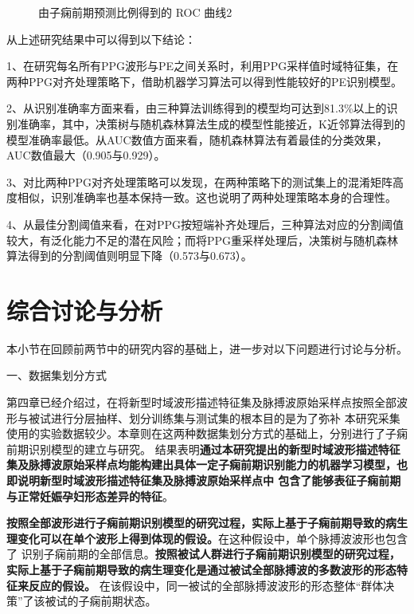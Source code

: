 \begin{figure}[htbp]
      \centering
      \quad
      \caption{\label{fig:model_roc2}由子痫前期预测比例得到的 ROC 曲线2}
\end{figure}

从上述研究结果中可以得到以下结论：

1、在研究每名所有PPG波形与PE之间关系时，利用PPG采样值时域特征集，在两种PPG对齐处理策略下，借助机器学习算法可以得到性能较好的PE识别模型。

2、从识别准确率方面来看，由三种算法训练得到的模型均可达到81.3\%以上的识别准确率，其中，决策树与随机森林算法生成的模型性能接近，K近邻算法得到的模型准确率最低。从AUC数值方面来看，随机森林算法有着最佳的分类效果，AUC数值最大（0.905与0.929）。

3、对比两种PPG对齐处理策略可以发现，在两种策略下的测试集上的混淆矩阵高度相似，识别准确率也基本保持一致。这也说明了两种处理策略本身的合理性。

4、从最佳分割阈值来看，在对PPG按短端补齐处理后，三种算法对应的分割阈值较大，有泛化能力不足的潜在风险；而将PPG重采样处理后，决策树与随机森林算法得到的分割阈值则明显下降（0.573与0.673）。

\section{综合讨论与分析}
本小节在回顾前两节中的研究内容的基础上，进一步对以下问题进行讨论与分析。

一、数据集划分方式

第四章已经介绍过，在将新型时域波形描述特征集及脉搏波原始采样点按照全部波形与被试进行分层抽样、划分训练集与测试集的根本目的是为了弥补
本研究采集使用的实验数据较少。本章则在这两种数据集划分方式的基础上，分别进行了子痫前期识别模型的建立与研究。
结果表明\textbf{通过本研究提出的新型时域波形描述特征集及脉搏波原始采样点均能构建出具体一定子痫前期识别能力的机器学习模型，也即说明新型时域波形描述特征集及脉搏波原始采样点中
包含了能够表征子痫前期与正常妊娠孕妇形态差异的特征}。

\textbf{按照全部波形进行子痫前期识别模型的研究过程，实际上基于子痫前期导致的病生理变化可以在单个波形上得到体现的假设。}在这种假设中，单个脉搏波波形也包含了
识别子痫前期的全部信息。\textbf{按照被试人群进行子痫前期识别模型的研究过程，实际上基于子痫前期导致的病生理变化是通过被试全部脉搏波的多数波形的形态特征来反应的假设。}
在该假设中，同一被试的全部脉搏波波形的形态整体“群体决策”了该被试的子痫前期状态。

